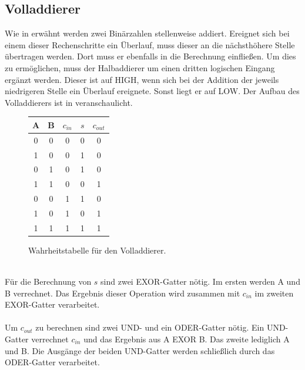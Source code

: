 \subsection{Volladdierer}
Wie in  erwähnt werden zwei Binärzahlen stellenweise addiert. Ereignet sich bei einem dieser Rechenschritte ein Überlauf, muss dieser an die nächsthöhere Stelle übertragen werden. Dort muss er ebenfalls in die Berechnung einfließen. Um dies zu ermöglichen, muss der Halbaddierer um einen dritten logischen Eingang ergänzt werden. Dieser ist auf HIGH, wenn sich bei der Addition der jeweils niedrigeren Stelle ein Überlauf ereignete. Sonst liegt er auf LOW. Der Aufbau des Volladdierers ist in \cite{zimmermann1998binary} veranschaulicht.\\
\begin{figure}
	\centering
	\begin{tabular}{|c|c|c|c|c|}
		\hline
		\textbf{A} & \textbf{B} & \textbf{$c_{in}$} & \textbf{$s$} & \textbf{$c_{out}$} \\
		\hline
		0 & 0 & 0 & 0 & 0 \\
		1 & 0 & 0 & 1 & 0 \\
		0 & 1 & 0 & 1 & 0 \\
		1 & 1 & 0 & 0 & 1 \\
		0 & 0 & 1 & 1 & 0 \\
		1 & 0 & 1 & 0 & 1 \\
		1 & 1 & 1 & 1 & 1 \\
		\hline
	\end{tabular}
	\caption{Wahrheitstabelle für den Volladdierer.}
\end{figure}\\
Für die Berechnung von $s$ sind zwei EXOR-Gatter nötig. Im ersten werden A und B verrechnet. Das Ergebnis dieser Operation wird zusammen mit $c_{in}$ im zweiten EXOR-Gatter verarbeitet.\\\\
Um $c_{out}$ zu berechnen sind zwei UND- und ein ODER-Gatter nötig. Ein UND-Gatter verrechnet $c_{in}$ und das Ergebnis aus A EXOR B. Das zweite lediglich A und B. Die Ausgänge der beiden UND-Gatter werden schließlich durch das ODER-Gatter verarbeitet.\\
